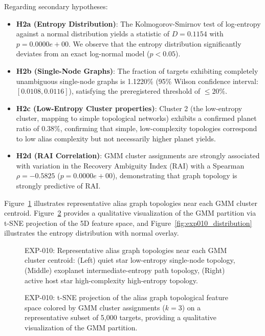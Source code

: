 Regarding secondary hypotheses:
\begin{itemize}
\item \textbf{H2a (Entropy Distribution)}: The Kolmogorov-Smirnov test of log-entropy against a normal distribution yields a statistic of $D = 0.1154$ with $p = 0.0000e+00$. We observe that the entropy distribution significantly deviates from an exact log-normal model ($p < 0.05$).
\item \textbf{H2b (Single-Node Graphs)}: The fraction of targets exhibiting completely unambiguous single-node graphs is 1.1220\% (95\% Wilson confidence interval: $[0.0108, 0.0116]$), satisfying the preregistered threshold of $\le 20\%$.
\item \textbf{H2c (Low-Entropy Cluster properties)}: Cluster 2 (the low-entropy cluster, mapping to simple topological networks) exhibits a confirmed planet ratio of 0.38\%, confirming that simple, low-complexity topologies correspond to low alias complexity but not necessarily higher planet yields.
\item \textbf{H2d (RAI Correlation)}: GMM cluster assignments are strongly associated with variation in the Recovery Ambiguity Index (RAI) with a Spearman $\rho = -0.5825$ ($p = 0.0000e+00$), demonstrating that graph topology is strongly predictive of RAI.
\end{itemize}

Figure~\ref{fig:exp010_gallery} illustrates representative alias graph topologies near each GMM cluster centroid. Figure~\ref{fig:exp010_tsne} provides a qualitative visualization of the GMM partition via t-SNE projection of the 5D feature space, and Figure~\ref{fig:exp010_distribution} illustrates the entropy distribution with normal overlay.

\begin{figure}[htbp]
\centering
{}
\caption{EXP-010: Representative alias graph topologies near each GMM cluster centroid: (Left) quiet star low-entropy single-node topology, (Middle) exoplanet intermediate-entropy path topology, (Right) active host star high-complexity high-entropy topology.}
\label{fig:exp010_gallery}
\end{figure}

\begin{figure}[htbp]
\centering
{}
\caption{EXP-010: t-SNE projection of the alias graph topological feature space colored by GMM cluster assignments ($k=3$) on a representative subset of 5,000 targets, providing a qualitative visualization of the GMM partition.}
\label{fig:exp010_tsne}
\end{figure}

